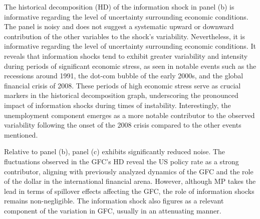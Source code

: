 \documentclass[11pt,a4paper]{article}
\begin{document}
The historical decomposition (HD) of the information shock in panel (b) is informative regarding the level of uncertainty surrounding economic conditions. 
The panel is noisy and does not suggest a systematic upward or downward contribution of the other variables to the shock's variability. 
Nevertheless, it is informative regarding the level of uncertainty surrounding economic conditions. 
It reveals that information shocks tend to exhibit greater variability and intensity during periods of significant economic stress, as seen in notable events such as the recessions around 1991, the dot-com bubble of the early 2000s, and the global financial crisis of 2008. These periods of high economic stress serve as crucial markers in the historical decomposition graph, underscoring the pronounced impact of information shocks during times of instability.
Interestingly, the unemployment component emerges as a more notable contributor to the observed variability following the onset of the 2008 crisis compared to the other events mentioned. %



Relative to panel (b), panel (c) exhibits significantly reduced noise. 
The fluctuations observed in the GFC's HD reveal the US policy rate as a strong contributor, aligning with previously analyzed dynamics of the GFC and the role of the dollar in the international financial arena. 
However, although MP takes the lead in terms of spillover effects affecting the GFC, the role of information shocks remains non-negligible.
The information shock also figures as a relevant component of the variation in GFC, usually in an attenuating manner. %


\end{document}

